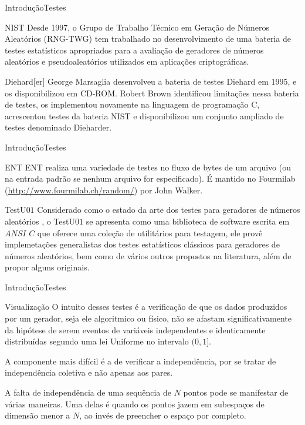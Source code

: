 \documentclass[10pt,xcolor={dvipsnames}]{beamer}
\begin{document}
\begin{frame}{Introdução}{Testes}
\begin{block}{NIST}
	Desde 1997, o Grupo de Trabalho Técnico em Geração de Números Aleatórios (RNG-TWG) tem trabalhado no desenvolvimento de uma bateria de testes estatísticos apropriados para a avaliação de geradores de números aleatórios e pseudoaleatórios utilizados em aplicações criptográficas.
\end{block}
\pause
\begin{block}{Diehard[er]}
	George Marsaglia desenvolveu a bateria de testes Diehard em 1995, e os disponibilizou em CD-ROM.
	Robert Brown identificou limitações nessa bateria de testes, os implementou novamente na linguagem de programação C, acrescentou testes da bateria NIST e disponibilizou um conjunto ampliado de testes denominado Dieharder.
\end{block}	
\end{frame}

\begin{frame}{Introdução}{Testes}
\begin{block}{ENT}
	ENT \cite{ENTTestSuite} realiza uma variedade de testes no fluxo de bytes de um arquivo (ou na entrada padrão se nenhum arquivo for especificado). É mantido no Fourmilab (\url{http://www.fourmilab.ch/random/}) por John Walker.
\end{block}
\pause
\begin{block}{TestU$01$}
	Considerado como o estado da arte dos testes para geradores de números aleatórios \cite{LEcuyer:07}, o TestU$01$ se apresenta como uma biblioteca de software escrita em $ANSI$ $C$ que oferece uma coleção de utilitários para testagem, ele provê implemetações generalistas dos testes estatísticos clássicos para geradores de números aleatórios, bem como de vários outros propostos na literatura, além de propor alguns originais.
\end{block}	
\end{frame}

\begin{frame}{Introdução}{Testes}
\begin{block}{Visualização}
	O intuito desses testes é a verificação de que os dados produzidos por um gerador, seja ele algoritmico ou físico, não se afastam significativamente da hipótese de serem eventos de variáveis independentes e identicamente distribuídas segundo uma lei Uniforme no intervalo $(0,1]$.
\pause	
	
	A componente mais difícil é a de verificar a independência, por se tratar de independência coletiva e não apenas aos pares.
\pause
	
	A falta de independência de uma sequência de $N$ pontos pode se manifestar de várias maneiras.
	Uma delas é quando os pontos jazem em subespaços de dimensão menor a $N$, ao invés de preencher o espaço por completo.
\end{block}
\end{frame}
\end{document}
